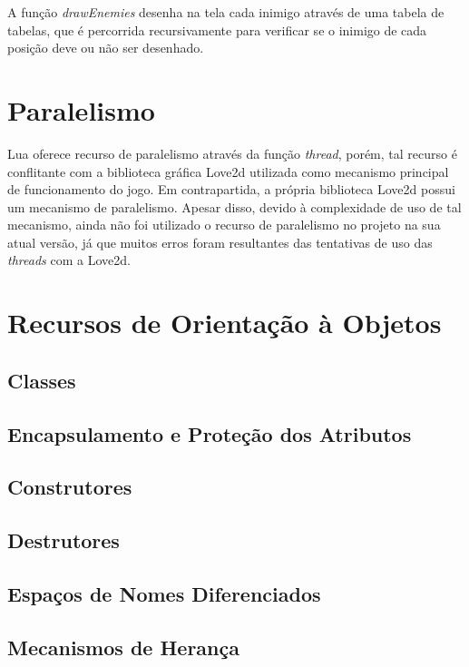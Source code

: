 \documentclass[rel_mlp]{iiufrgs}
\begin{document}
A função \textit{drawEnemies} desenha na tela cada inimigo através de uma tabela de tabelas, que é percorrida recursivamente para verificar se o inimigo de cada posição deve ou não ser desenhado.

\chapter{Paralelismo}

Lua oferece recurso de paralelismo através da função \textit{thread}, porém, tal recurso é conflitante com a biblioteca gráfica Love2d utilizada como mecanismo principal de funcionamento do jogo. Em contrapartida, a própria biblioteca Love2d possui um mecanismo de paralelismo. Apesar disso, devido à complexidade de uso de tal mecanismo, ainda não foi utilizado o recurso de paralelismo no projeto na sua atual versão, já que muitos erros foram resultantes das tentativas de uso das \textit{threads} com a Love2d.


\chapter{Recursos de Orientação à Objetos}

\section{Classes}

\section{Encapsulamento e Proteção dos Atributos}

\section{Construtores}

\section{Destrutores}

\section{Espaços de Nomes Diferenciados}

\section{Mecanismos de Herança}
\end{document}
